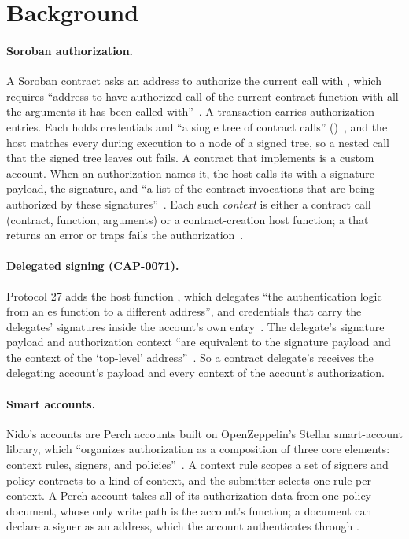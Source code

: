 \section{Background}\label{sec:background}

\paragraph{Soroban authorization.} A Soroban contract asks an address to
authorize the current call with , which requires ``address
to have authorized call of the current contract function with all the
arguments it has been called with''~\cite{cap46auth}. A transaction carries
authorization entries. Each holds credentials and ``a single tree of contract
calls'' ()~\cite{cap46auth}, and the host
matches every  during execution to a node of a signed
tree, so a nested call that the signed tree leaves out fails. A contract that
implements  is a custom account. When an authorization
names it, the host calls its  with a signature payload,
the signature, and ``a list of the contract invocations that are being
authorized by these signatures''~\cite{stellarAuthDocs}. Each such
\emph{context} is either a contract call (contract, function, arguments) or a
contract-creation host function; a  that returns an
error or traps fails the authorization~\cite{cap46auth}.

\paragraph{Delegated signing (CAP-0071).} Protocol 27 adds the host function
, which delegates ``the authentication logic from
an es  function to a different address'',
and credentials that carry the delegates' signatures inside the account's own
entry~\cite{cap71,cap7101}. The delegate's signature payload and authorization
context ``are equivalent to the signature payload and the context of the
`top-level' address''~\cite{cap7101}. So a contract delegate's
 receives the delegating account's payload and every
context of the account's authorization.

\paragraph{Smart accounts.} Nido's accounts are Perch accounts built on
OpenZeppelin's Stellar smart-account library, which ``organizes authorization
as a composition of three core elements: context rules, signers, and
policies''~\cite{ozStellarAccounts}. A context rule scopes a set of signers
and policy contracts to a kind of context, and the submitter selects one rule
per context. A Perch account takes all of its authorization data from one
policy document, whose only write path is the account's 
function; a document can declare a signer as an address, which the account
authenticates through .

